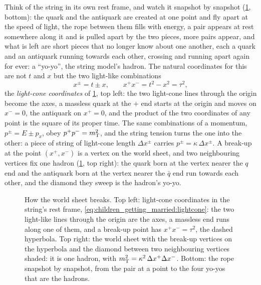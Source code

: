 Think of the string in its own rest frame, and watch it snapshot by
snapshot (\cref{fig:children_getting_married:lightcone_sketch}, bottom):
the quark and the antiquark are created at one point and fly apart at the
speed of light, the rope between them fills with energy, a pair appears
at rest somewhere along it and is pulled apart by the two pieces, more
pairs appear, and what is left are short pieces that no longer know about
one another, each a quark and an antiquark running towards each other,
crossing and running apart again for ever: a ``yo-yo'', the string
model's hadron. The natural coordinates for this are not $t$ and $x$ but
the two light-like combinations
\begin{equation}
  x^\pm=t\pm x,\qquad x^+x^-=t^2-x^2=\tau^2,
  \label{eq:children_getting_married:lightcone}
\end{equation}
the \emph{light-cone coordinates} of
\cref{fig:children_getting_married:lightcone_sketch}, top left: the two
light-cone lines through the origin become the axes, a massless quark at
the $+$ end starts at the origin and moves on $x^-=0$, the antiquark on
$x^+=0$, and the product of the two coordinates of any point is the square
of its proper time. The same combinations of a momentum, $p^\pm=E\pm p_x$,
obey $p^+p^-=m_{\mathrm{T}}^2$, and the string tension turns the one into the other:
a piece of string of light-cone length $\Delta x^\pm$ carries
$p^\pm=\kappa\,\Delta x^\pm$. A break-up at the point $(x^+,x^-)$ is a
vertex on the world sheet, and two neighbouring vertices fix one hadron
(\cref{fig:children_getting_married:lightcone_sketch}, top right): the quark
born at the vertex nearer the $q$ end and the antiquark born at the vertex
nearer the $\bar q$ end run towards each other, and the diamond they sweep
is the hadron's yo-yo.

\begin{figure}[htbp]\centering
\resizebox{\textwidth}{!}{}
\caption[Light-cone coordinates, the rope snapshot by snapshot and the
hadrons on the world sheet]{How the world sheet breaks. Top left:
light-cone coordinates in the string's rest frame,
\cref{eq:children_getting_married:lightcone}: the two light-like lines
through the origin are the axes, a massless end runs along one of them,
and a break-up point has $x^+x^-=\tau^2$, the dashed hyperbola. Top
right: the world sheet with the break-up vertices on the hyperbola and
the diamond between two neighbouring vertices shaded: it is one hadron,
with $m_{\mathrm{T}}^2=\kappa^2\,\Delta x^+\Delta x^-$. Bottom: the rope snapshot
by snapshot, from the pair at a point to the four yo-yos that are the
hadrons.}
\label{fig:children_getting_married:lightcone_sketch}
\end{figure}

